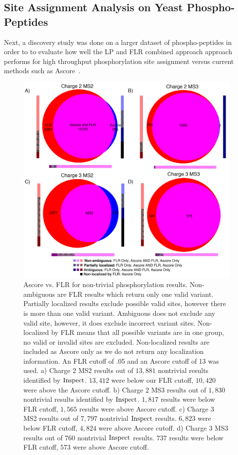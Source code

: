 \documentclass[11pt]{article}
\newcommand{\inspect}{${\rm Inspect}$}
\begin{document}
{\subsection{Site Assignment Analysis on Yeast Phospho-Peptides}\label{sec:yeastphosphoresults}
Next, a discovery study was done on a larger dataset of phospho-peptides in order to to evaluate how well the LP and FLR combined approach approach performs for high throughput phosphorylation site assignment versus current methods such as Ascore~\cite{beausoleil06}.

\begin{figure}[h!]
\centering
\includegraphics[scale=.65]{fig/venn_diagrams.png}
\caption[Ascore vs. FLR in Phosphorylation Results]{Ascore vs. FLR for non-trivial phosphorylation results. Non-ambiguous are FLR results which return only one valid variant. Partially localized results exclude possible valid sites, however there is more than one valid variant. Ambiguous does not exclude any valid site, however, it does exclude incorrect variant sites. Non-localized by FLR means that all possible variants are in one group, no valid or invalid sites are excluded. Non-localized results are included as Ascore only as we do not return any localization information. An FLR cutoff of .05 and an Ascore cutoff of 13 was used. a) Charge 2 MS2 results out of $13,881$ nontrivial results identified by {\inspect}. $13,412$ were below our FLR cutoff, $10,420$ were above the Ascore cutoff. b) Charge 2 MS3 results out of $1,830$ nontrivial results identified by {\inspect}. $1,817$ results were below FLR cutoff, $1,565$ results were above Ascore cutoff. c) Charge 3 MS2 results out of $7,797$ nontrivial {\inspect} results. $6,823$ were below FLR cutoff, $4,824$ were above Ascore cutoff. d) Charge 3 MS3 results out of $760$ nontrivial {\inspect} results. $737$ results were below FLR cutoff, $573$ were above Ascore cutoff.}
\label{fig:ascoreVsLP}
\end{figure}

}
\end{document}
